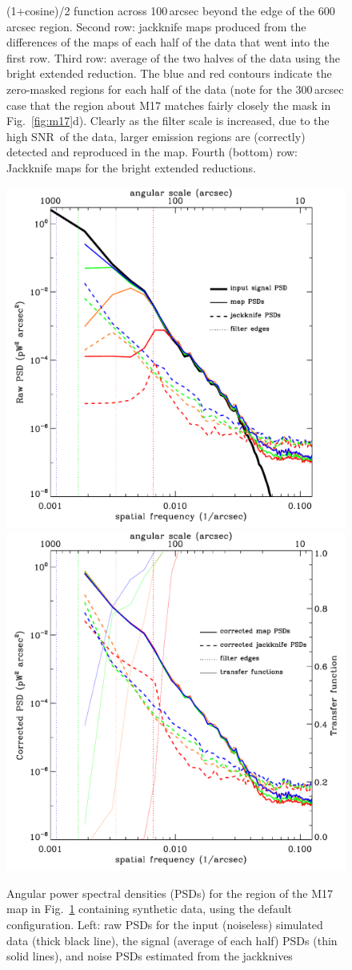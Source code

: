 \documentclass[useAMS,usenatbib,nofootinbib]{mn2e}
\newcommand{\snr}{SNR}
\begin{document}
\begin{figure}
{(1+cosine)/2 function across 100\,arcsec beyond the edge of the
600\,arcsec region. Second row: jackknife maps produced from the
differences of the maps of each half of the data that went into the
first row. Third row: average of the two halves of the data using the
bright extended reduction. The blue and red contours indicate the
zero-masked regions for each half of the data (note for the
300\,arcsec case that the region about M17 matches fairly closely the
mask in Fig.~\ref{fig:m17}d). Clearly as the filter scale is
increased, due to the high \snr\ of the data, larger emission regions
are (correctly) detected and reproduced in the map. Fourth (bottom)
row: Jackknife maps for the bright extended reductions.}
\label{fig:m17_jk}
\end{figure}

\begin{figure}
\centering
\includegraphics[width=0.49\linewidth]{pspec_m17_default.pdf}
\includegraphics[width=0.49\linewidth]{cor_pspec_m17_default.pdf}
\caption{Angular power spectral densities (PSDs) for the region of the
M17 map in Fig.~\ref{fig:m17_jk} containing synthetic data, using the
default configuration. Left: raw PSDs for the input (noiseless)
simulated data (thick black line), the signal (average of each half)
PSDs (thin solid lines), and noise PSDs estimated from the jackknives
}
\end{figure}
\end{document}
